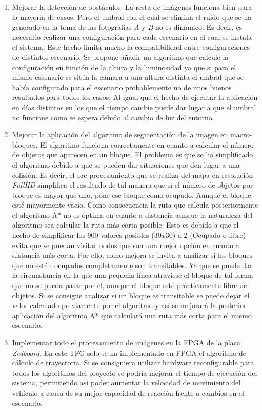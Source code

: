 \begin{enumerate}
\item Mejorar la detección de obstáculos. La resta de imágenes funciona bien para la mayoría de casos. Pero el umbral con el cual se elimina el ruido que se ha generado en la toma de las fotografías \emph{A} y \emph{B} no es dinámico. Es decir, es necesario realizar una configuración para cada escenario en el cual se instala el sistema. Este hecho limita mucho la compatibilidad entre configuraciones de distintos escenario. Se propone añadir un algoritmo que calcule la configuración en función de la altura y la luminosidad ya que si para el mismo escenario se sitúa la cámara a una altura distinta el umbral que se había configurado para el escenario probablemente no de unos buenos resultados para todos los casos. Al igual que el hecho de ejecutar la aplicación en días distintos en los que el tiempo cambie puede dar lugar a que el umbral no funcione como se espera debido al cambio de luz del entorno.
\item Mejorar la aplicación del algoritmo de segmentación de la imagen en macro-bloques. El algoritmo funciona correctamente en cuanto a calcular el número de objetos que aparecen en un bloque. El problema es que se ha simplificado el algoritmo debido a que se pueden dar situaciones que den lugar a una colisión. Es decir, el pre-procesamiento que se realiza del mapa en resolución \emph{FullHD} simplifica el resultado de tal manera que si el número de objetos por bloque es mayor que uno, pone ese bloque como ocupado. Aunque el bloque esté mayormente vacío. Como consecuencia la ruta que calcula posteriormente el algoritmo A* no es óptima en cuanto a distancia aunque la naturaleza del algoritmo sea calcular la ruta más corta posible. Esto es debido a que el hecho de simplificar los 900 valores posibles ($30x30$) a 2 (Ocupado o libre) evita que se puedan visitar nodos que son una mejor opción en cuanto a distancia más corta. Por ello, como mejora se invita a analizar si los bloques que no están ocupados completamente son transitables. Ya que se puede dar la circunstancia en la que una pequeña línea atraviese el bloque de tal forma que no se pueda pasar por el, aunque el bloque esté prácticamente libre de objetos. Si se consigue analizar si un bloque es transitable se puede dejar el valor calculado previamente por el algoritmo y así se mejorará la posterior aplicación del algoritmo A* que calculará una ruta más corta para el mismo escenario.
\item Implementar todo el procesamiento de imágenes en la FPGA de la placa \emph{Zedboard}. En este \ac{TFG} solo se ha implementado en \ac{FPGA} el algoritmo de cálculo de trayectoria. Si se consiguiera utilizar hardware reconfigurable para todos los algoritmos del proyecto se podría mejorar el tiempo de ejecución del sistema, permitiendo así poder aumentar la velocidad de movimiento del vehículo a causa de su mejor capacidad de reacción frente a cambios en el escenario.
\end{enumerate}